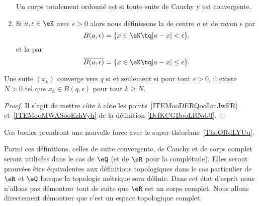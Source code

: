 \begin{definition}
\begin{enumerate}
            Un corps totalement ordonné est  si toute suite de Cauchy y est convergente.
        \item       \label{ITEMooMWASooEzhVyh}
            Si \( a,\epsilon\in \eK\) avec \( \epsilon>0\) alors nous définissons la  de centre \( a\) et de rayon \( \epsilon\) par
            \begin{equation}
                B(a,\epsilon)=\{ x\in \eK\tq | a-x |<\epsilon \},
            \end{equation}
            et la  par
            \begin{equation}
                \overline{ B(a,\epsilon) }=\{ x\in \eK\tq | a-x |\leq \epsilon \}.
            \end{equation}

    \end{enumerate}
\end{definition}

\begin{lemma}
    Une suite \( (x_k)\) converge vers \( q\) si et seulement si pour tout \( \epsilon>0\), il existe \( N>0\) tel que \( x_k\in B(q,\epsilon)\) pour tout \( k\geq N\).
\end{lemma}

\begin{proof}
    Il s'agit de mettre côte à côte les points~\ref{ITEMooDERQooLmJwFR} et~\ref{ITEMooMWASooEzhVyh} de la définition \ref{DefKCGBooLRNdJf}.
\end{proof}

\begin{normaltext}
    Ces boules prendront une nouvelle force avec le super-théorème~\ref{ThoORdLYUu}.
\end{normaltext}

Parmi ces définitions, celles de suite convergente, de Cauchy et de corps complet seront utilisées dans le cas de \( \eQ\) (et de \( \eR\) pour la complétude). Elles seront prouvées être équivalentes aux définitions topologiques dans le cas particulier de \( \eR\) et \( \eQ\) lorsque la topologie métrique sera définie. Dans cet état d'esprit nous n'allons pas démontrer tout de suite que \( \eR\) est un corps complet. Nous allons directement démontrer que c'est un espace topologique complet.

